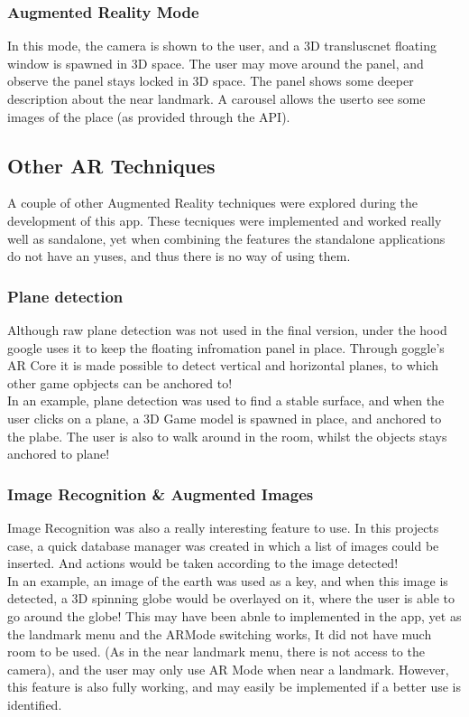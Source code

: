 \subsubsection{Augmented Reality Mode}
In this mode, the camera is shown to the user, and a 3D transluscnet floating window is spawned in 3D space.
The user may move around the panel, and observe the panel stays locked in 3D space. The panel shows
some deeper description about the near landmark. A carousel allows the userto see some images of the place
 (as provided through the API).  

 \subsection{Other AR Techniques}
 A couple of other Augmented Reality techniques were explored during the development of this app. 
 These tecniques were implemented and worked really well as sandalone, yet when combining the features 
 the standalone applications do not have an yuses, and thus there is no way of using them. 
 \subsubsection{Plane detection}
 Although raw plane detection was not used in the final version, under the hood google uses it to keep the 
 floating infromation panel in place. Through goggle's AR Core it is made possible to detect vertical 
 and horizontal planes, to which other game opbjects can be anchored to!\\

 In an example, plane detection was used to find a stable surface, and when the user clicks on a 
 plane, a 3D Game model is spawned in place, and anchored to the plabe. The user is also to walk around 
 in the room, whilst the objects stays anchored to plane! 

 \subsubsection{Image Recognition \& Augmented Images}
 Image Recognition was also a really interesting feature to use. 
 In this projects case, a quick database manager was created in which a list of images could
  be inserted. And actions would be taken according to the image detected!\\

In an example, an image of the earth was used as a key, and when this image is detected, a 3D spinning 
globe would be overlayed on it, where the user is able to go around the globe!
This may have been abnle to implemented in the app, yet as the landmark menu and the ARMode switching 
works, It did not have much room to be used. (As in the near landmark menu, there is 
not access to the camera), and the user may only use AR Mode when near a landmark. However, this 
feature is also fully working, and may easily be implemented if a better use is identified. 

